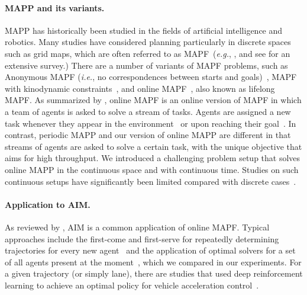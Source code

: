 \documentclass[letterpaper]{article} %
\def\eg{{\it e.g.}}
\def\ie{{\it i.e.}}
\begin{document}
\paragraph{MAPP and its variants.} 
MAPP has historically been studied in the fields of artificial intelligence and robotics. Many studies have considered planning particularly in discrete spaces such as grid maps, which are often referred to as MAPF~(\eg, \citet{silver2005cooperative,sharon2015conflict}, and see \citet{stern2019multi} for an extensive survey.) There are a number of variants of MAPF problems, such as Anonymous MAPF (\ie, no correspondences between starts and goals)~\cite{Kloder2006,Yu2013}, MAPF with kinodynamic constraints~\cite{honig2018trajectory,ijcai2018-74}, and online MAPF~\cite{vsvancara2019online,ma2017lifelong,Li2021}, also known as lifelong MAPF. As summarized by \citet{Ma2021}, online MAPF is an online version of MAPF in which a team of agents is asked to solve a stream of tasks. Agents are assigned a new task whenever they appear in the environment~\cite{vsvancara2019online} or upon reaching their goal~\cite{ma2017lifelong}. In contrast, periodic MAPP and our version of online MAPP are different in that streams of agents are asked to solve a certain task, with the unique objective that aims for high throughput. We introduced a challenging problem setup that solves online MAPP in the continuous space and with continuous time. Studies on such continuous setups have significantly been limited compared with discrete cases~\cite{walker2018extended,honig2018trajectory,andreychuk2021improving,andreychuk2022multi,kasaura2022prioritized,okumura2022ctrms}.




\paragraph{Application to AIM.} As reviewed by \citet{stern2019multi,Ma2021}, AIM is a common application of online MAPF. Typical approaches include the first-come and first-serve for repeatedly determining trajectories for every new agent~\cite{dresner2008multiagent} and the application of optimal solvers for a set of all agents present at the moment~\cite{vsvancara2019online}, which we compared in our experiments. For a given trajectory (or simply lane), there are studies that used deep reinforcement learning to achieve an optimal policy for vehicle acceleration control~\cite{Kreidieh2018,Jang2019,Cui2021}.
\end{document}
